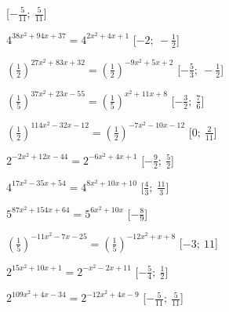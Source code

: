 \begin{esercizio}
\begin{enumeratea}
   \hfill [\(-\frac{5}{11};~\frac{5}{11}\)]
  \item  \(4^{38 x^2 +94 x +37} = 4^{2 x^2 +4 x +1}\)
   \hfill [\(-2;~-\frac{1}{2}\)]
  \item  \(\left(\frac{1}{2}\right)^{27 x^2 +83 x +32} = 
\left(\frac{1}{2}\right)^{-9 x^2 +5 x +2}\)
   \hfill [\(-\frac{5}{3};~-\frac{1}{2}\)]
  \item  \(\left(\frac{1}{5}\right)^{37 x^2 +23 x -55} = 
\left(\frac{1}{5}\right)^{x^2 +11 x +8}\)
   \hfill [\(-\frac{3}{2};~\frac{7}{6}\)]
  \item  \(\left(\frac{1}{2}\right)^{114 x^2 -32 x -12} = 
\left(\frac{1}{2}\right)^{-7 x^2 -10 x -12}\)
   \hfill [\(0;~\frac{2}{11}\)]
  \item  \(2^{-2 x^2 +12 x -44} = 2^{-6 x^2 +4 x +1}\)
   \hfill [\(-\frac{9}{2};~\frac{5}{2}\)]
  \item  \(4^{17 x^2 -35 x +54} = 4^{8 x^2 +10 x +10}\)
   \hfill [\(\frac{4}{3};~\frac{11}{3}\)]
  \item  \(5^{87 x^2 +154 x +64} = 5^{6 x^2 +10 x }\)
   \hfill [\(-\frac{8}{9}\)]
  \item  \(\left(\frac{1}{5}\right)^{-11 x^2 -7 x -25} = 
\left(\frac{1}{5}\right)^{-12 x^2 + x +8}\)
   \hfill [\(-3;~11\)]
  \item  \(2^{15 x^2 +10 x +1} = 2^{- x^2 -2 x +11}\)
   \hfill [\(-\frac{5}{4};~\frac{1}{2}\)]
  \item  \(2^{109 x^2 +4 x -34} = 2^{-12 x^2 +4 x -9}\)
   \hfill [\(-\frac{5}{11};~\frac{5}{11}\)]
 \end{enumeratea}
\end{esercizio}


